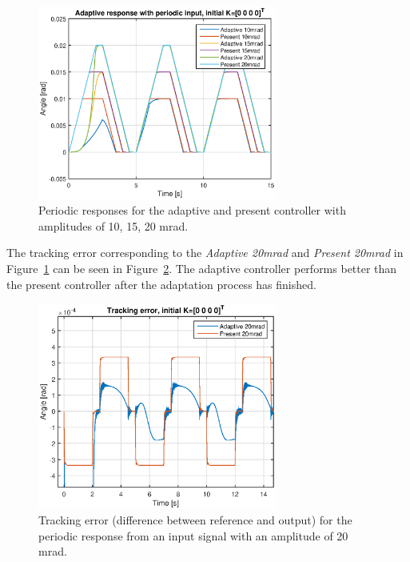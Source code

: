 \begin{figure}[h!]
  \centering
  \includegraphics[width=0.7\textwidth]{fig/matlab/periodicresponse.eps}
  \caption{\label{fig:periodic_resp} Periodic responses for the adaptive and present controller with amplitudes of 10, 15, 20 mrad.}
\end{figure}

The tracking error corresponding to the \emph{Adaptive 20mrad} and \emph{Present 20mrad} in Figure~\ref{fig:periodic_resp} can be seen in Figure~\ref{fig:adapt_trackingerror}. The adaptive controller performs better than the present controller after the adaptation process has finished.
\begin{figure}[h!]
  \centering
  \includegraphics[width=0.7\textwidth]{fig/matlab/trackingerror.eps}
  \caption{\label{fig:adapt_trackingerror} Tracking error (difference between reference and output) for the periodic response from an input signal with an amplitude of 20 mrad.}
\end{figure}

